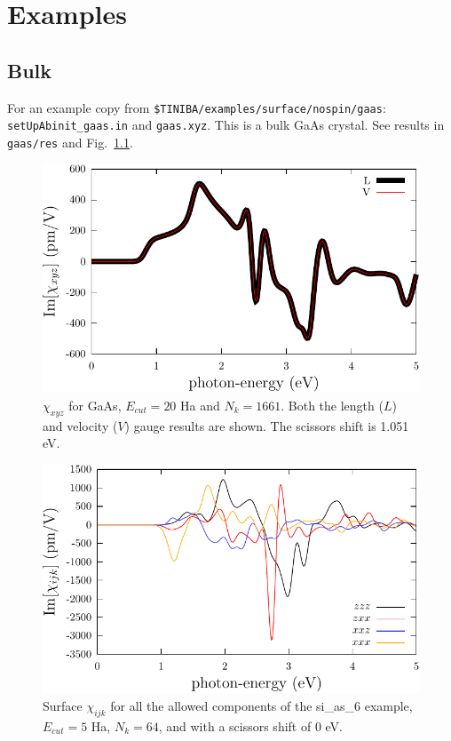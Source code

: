 \chapter{Examples}
\section{Bulk} 
For an example copy from \verb=$TINIBA/examples/surface/nospin/gaas=:\\
\verb=setUpAbinit_gaas.in= and \verb=gaas.xyz=. This is a
bulk GaAs crystal. See results in \verb=gaas/res= and Fig.~\ref{shg-bulk}.
\begin{figure}[t]
\begin{center}
\includegraphics[scale=0.5]{plots/shg-bulk}
\end{center}
\caption{$\chi_{xyz}$ for GaAs, $E_{cut}=20$ Ha and $N_k=1661$. Both
  the length ($L$) and velocity ($V$) gauge results are shown.
The scissors shift is 1.051 eV.
}
\label{shg-bulk}
\end{figure}
\begin{figure}[t]
\begin{center}
\includegraphics[scale=0.5]{plots/shg-surface}
\end{center}
\caption{Surface $\chi_{ijk}$ for all the allowed components of the
  si\_as\_6 example, $E_{cut}=5$ 
  Ha, $N_k=64$, and with a scissors shift of 0 eV. 
}
\label{shg-surface}
\end{figure}

